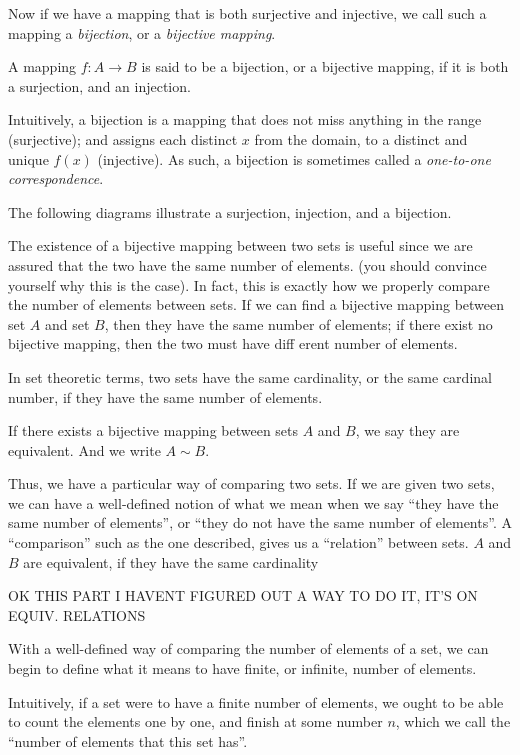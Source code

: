 \documentclass[../../templates/section]{subfiles}
\begin{document}
Now if we have a mapping that is both surjective and injective, we call such a
mapping a \emph{bijection}, or a \emph{bijective mapping}.

\begin{definition}
A mapping $f:A\to B$ is said to be a bijection, or a bijective mapping,
if it is both a surjection, and an injection.
\end{definition} 

Intuitively, a bijection is a mapping that does not miss anything in the range
(surjective); and assigns each distinct $x$ from the domain, to a distinct and
unique $f(x)$ (injective). As such, a bijection is sometimes called a \emph{one-to-one 
correspondence}.


The following diagrams illustrate a surjection, injection, and a bijection.

The existence of a bijective mapping between two sets is useful since we are
assured that the two have the same number of elements.  (you should convince
yourself why this is the case). In fact, this is exactly how we properly
compare the number of elements between sets. If we can find a bijective mapping
between set $A$ and set $B$, then they have the same number of elements; if
there exist no bijective mapping, then the two must have diff erent number of
elements. 

In set theoretic terms, two sets have the same cardinality, or the same
cardinal number, if they have the same number of elements.

\begin{definition}
If there exists a bijective mapping between sets $A$ and $B$, we say they are 
equivalent. And we write $A \sim B$.
\end{definition}

Thus, we have a particular way of comparing two sets. If we are given two sets,
we can have a well-defined notion of what we mean when we say ``they have the
same number of elements'', or ``they do not have the same number of elements''.
A ``comparison'' such as the one described, gives us a ``relation'' between
sets. $A$ and $B$ are equivalent, if they have the same cardinality

OK THIS PART I HAVENT FIGURED OUT A WAY TO DO IT, IT'S ON EQUIV. RELATIONS

With a well-defined way of comparing the number of elements of a set, we can
begin to define what it means to have finite, or infinite, number of elements.

Intuitively, if a set were to have a finite number of elements, we ought to be 
able to count the elements one by one, and finish at some number $n$, which we
call the ``number of elements that this set has''. 
\end{document}
